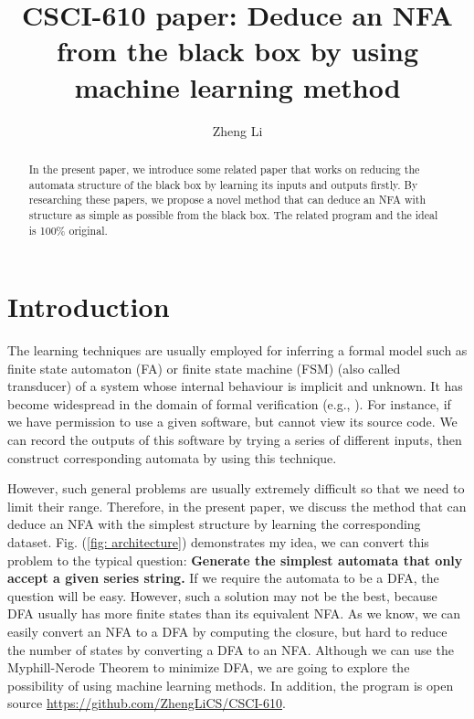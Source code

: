 \documentclass{article}
\begin{document}
\title{CSCI-610 paper: Deduce an NFA from the black box by using machine learning method}

\author{Zheng Li}
\maketitle

\newpage

\begin{abstract}
    In the present paper, we introduce some related paper that works on reducing the automata structure of the black box by learning its inputs and outputs firstly. 
    By researching these papers,  we propose a novel method that can deduce an NFA with structure as simple as possible from the black box. The related program and the ideal is 100\% original. 
\end{abstract}
\newpage

\section{Introduction}
The learning techniques are usually employed for inferring a formal model such as finite state automaton (FA) or finite state machine (FSM) (also called transducer) of a system whose internal behaviour is implicit and unknown. It has become widespread in the domain of formal verification (e.g., \cite{peled1999black,groce2002adaptive,cobleigh2003learning,chaki2008verification}).
For instance, if we have permission to use a given software, but cannot view its source code. We can record the outputs of this software by trying a series of different inputs, then construct corresponding automata by using this technique. 


However, such general problems are usually extremely difficult\cite{pacharoen2013active} so that we need to limit their range. Therefore, in the present paper, we discuss the method that can deduce an NFA with the simplest structure by learning the corresponding dataset. Fig. (\ref{fig: architecture}) demonstrates my idea, we can convert this problem to the typical question: \textbf{Generate the simplest automata that only accept a given series string.} If we require the automata to be a DFA, the question will be easy. However, such a solution may not be the best, because DFA usually has more finite states than its equivalent NFA. As we know, we can easily convert an NFA to a DFA by computing the closure, but hard to reduce the number of states by converting a DFA to an NFA. Although we can use the Myphill-Nerode Theorem\cite{nerode1958linear} to minimize DFA, we are going to explore the possibility of using machine learning methods. In addition, the program is open source \href{https://github.com/ZhengLiCS/CSCI-610}{\color{cyan}https://github.com/ZhengLiCS/CSCI-610}.
\end{document}

